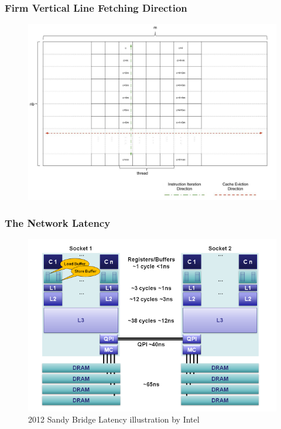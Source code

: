 \documentclass{beamer}
\begin{document}
\begin{frame}[plain]
	\frametitle{Firm Vertical Line Fetching Direction}
		\begin{figure}
			\includegraphics[width=1\linewidth]{img/vertical_instruction_iteration.jpg}
		\end{figure}
\end{frame}


\begin{frame}[plain]
	\frametitle{The Network Latency}
		\begin{figure}
			\includegraphics[width=1\linewidth]{img/memory_latency.png}
			\caption{2012 Sandy Bridge Latency illustration by Intel}
		\end{figure}
\end{frame}
\end{document}
